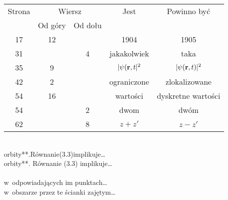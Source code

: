 \documentclass[a4paper,11pt]{article}
\begin{document}
\noindent



\begin{center}

  \begin{tabular}{|c|c|c|c|c|}
    \hline
    Strona & \multicolumn{2}{c|}{Wiersz} & Jest
                              & Powinno być \\ \cline{2-3}
    & Od góry & Od dołu & & \\
    \hline
    17 & 12 & & 1904 & 1905 \\
    31 & & 4 & jakakolwiek & taka \\
    35 & 9 & & $| \psi( \mathbf{r}, t |^{ 2 }$ & $| \psi( \mathbf{r}, t ) |^{ 2 }$ \\
    42 & 2 & & ograniczone & zlokalizowane \\
    54 & 16 & & wartości & dyskretne wartości \\
    54 & & 2 & dwom & dwóm \\
    62 & & 8 & $z + z'$ & $z - z'$ \\
    \hline
  \end{tabular}

\end{center}

\vspace{\spaceTwo}


\noindent
{} \\
\Jest  orbity**.Równanie(3.3)implikuje\ldots \\
\Powin orbity**. Równanie (3.3) implikuje\ldots \\
 \\
\Jest  w~odpowiadających im punktach\ldots  \\
\Powin w~obszarze przez te ścianki zajętym\ldots \\













\newpage

\end{document}

